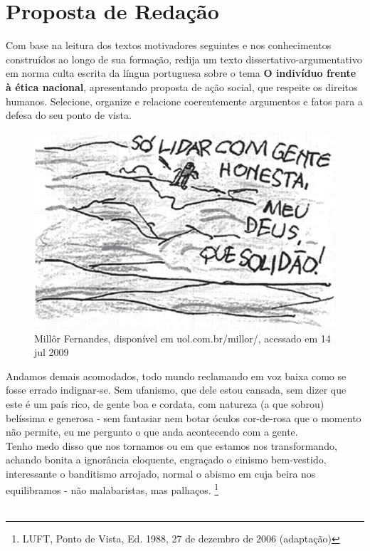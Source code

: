 \documentclass[10pt,a4paper]{article}
\begin{document}
\section*{Proposta de Reda\c{c}\~ao}
	Com base na leitura dos textos motivadores seguintes e nos conhecimentos constru\'idos ao longo de sua forma\c{c}\~ao, redija um texto dissertativo-argumentativo em norma culta escrita da l\'ingua portuguesa sobre o tema \textbf{O indiv\'iduo frente \`a \'etica nacional}, apresentando proposta de a\c{c}\~ao social, que respeite os direitos humanos. Selecione, organize e relacione coerentemente argumentos e fatos para a defesa do seu ponto de vista. \\

\begin{figure}[!ht]
	\centering
     \includegraphics[scale=0.7]{redacao.jpg}
     \caption{Mill\^or Fernandes, dispon\'ivel em uol.com.br/millor/, acessado em 14 jul 2009}
     \label{redacao}
\end{figure}


Andamos demais acomodados, todo mundo reclamando em voz baixa como se fosse errado indignar-se. Sem ufanismo, que dele estou cansada, sem dizer que este \'e um pa\'is rico, de gente boa e cordata, com natureza (a que sobrou) bel\'issima e generosa - sem fantasiar nem botar \'oculos cor-de-rosa que o momento n\~ao permite, eu me pergunto o que anda acontecendo com a gente. \\
 Tenho medo disso que nos tornamos ou em que estamos nos transformando, achando bonita a ignor\^ancia eloquente, engra\c{c}ado o cinismo bem-vestido, interessante o banditismo arrojado, normal o abismo em cuja beira nos equilibramos - n\~ao malabaristas, mas palha\c{c}os. \footnote{LUFT, Ponto de Vista, Ed. 1988, 27 de dezembro de 2006 (adapta\c{c}\~ao)} \\ \\
\end{document}
